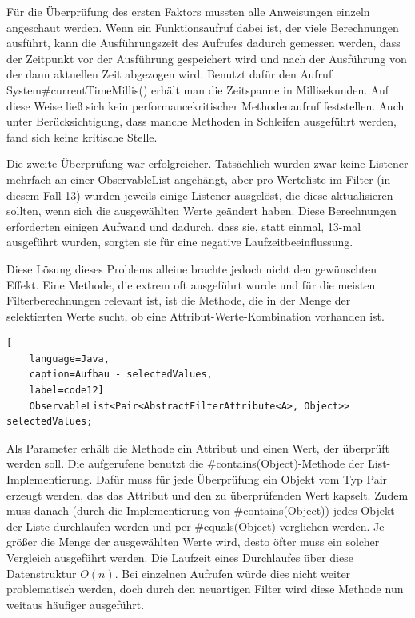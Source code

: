 Für die Überprüfung des ersten Faktors mussten alle Anweisungen einzeln angeschaut werden. Wenn ein Funktionsaufruf dabei ist, der viele Berechnungen ausführt, kann die Ausführungszeit des Aufrufes dadurch gemessen werden, dass der Zeitpunkt vor der Ausführung gespeichert wird und nach der Ausführung von der dann aktuellen Zeit abgezogen wird. Benutzt dafür den Aufruf System\#currentTimeMillis() erhält man die Zeitspanne in Millisekunden. Auf diese Weise ließ sich kein performancekritischer Methodenaufruf feststellen. Auch unter Berücksichtigung, dass manche Methoden in Schleifen ausgeführt werden, fand sich keine kritische Stelle.

Die zweite Überprüfung war erfolgreicher. Tatsächlich wurden zwar keine Listener mehrfach an einer ObservableList angehängt, aber pro Werteliste im Filter (in diesem Fall 13) wurden jeweils einige Listener ausgelöst, die diese aktualisieren sollten, wenn sich die ausgewählten Werte geändert haben. Diese Berechnungen erforderten einigen Aufwand und dadurch, dass sie, statt einmal, 13-mal ausgeführt wurden, sorgten sie für eine negative Laufzeitbeeinflussung.

Diese Lösung dieses Problems alleine brachte jedoch nicht den gewünschten Effekt. Eine Methode, die extrem oft ausgeführt wurde und für die meisten Filterberechnungen relevant ist, ist die Methode, die in der Menge der selektierten Werte sucht, ob eine Attribut-Werte-Kombination vorhanden ist.

\begin{lstlisting}[
    language=Java,
    caption=Aufbau - selectedValues,
    label=code12]
	ObservableList<Pair<AbstractFilterAttribute<A>, Object>> selectedValues;
\end{lstlisting}

Als Parameter erhält die Methode ein Attribut und einen Wert, der überprüft werden soll. Die aufgerufene benutzt die \#contains(Object)-Methode der List-Implementierung. Dafür muss für jede Überprüfung ein Objekt vom Typ Pair erzeugt werden, das das Attribut und den zu überprüfenden Wert kapselt. Zudem muss danach (durch die Implementierung von \#contains(Object)) jedes Objekt der Liste durchlaufen werden und per \#equals(Object) verglichen werden. Je größer die Menge der ausgewählten Werte wird, desto öfter muss ein solcher Vergleich ausgeführt werden. Die Laufzeit eines Durchlaufes über diese Datenstruktur $O(n)$. Bei einzelnen Aufrufen würde dies nicht weiter problematisch werden, doch durch den neuartigen Filter wird diese Methode nun weitaus häufiger ausgeführt.

